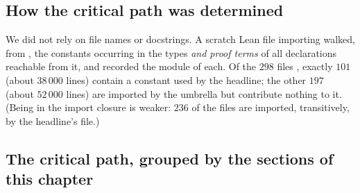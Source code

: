 \subsection{How the critical path was determined}

We did not rely on file names or docstrings. A scratch Lean file importing
 walked, from , the
constants occurring in the types \emph{and proof terms} of all declarations reachable from it, and recorded the module of each.
Of the $298$ files , exactly $101$ (about $38\,000$ lines) contain a constant used by the headline; the
other $197$ (about $52\,000$ lines) are imported by the umbrella but contribute nothing to it. (Being in the import closure is
weaker: $236$ of the files are imported, transitively, by the headline's file.)

\subsection{The critical path, grouped by the sections of this chapter}


